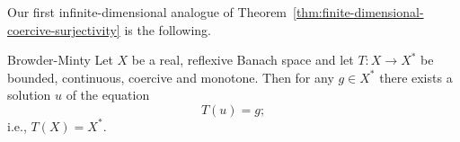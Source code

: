 Our first infinite-dimensional analogue of Theorem~\ref{thm:finite-dimensional-coercive-surjectivity} is the following.

\begin{Theorem}{Browder-Minty}
\label{thm:browder-minty-surjectivity}
Let $X$ be a real, reflexive Banach space and let $T:X\to X^*$ be bounded, continuous, coercive and monotone. Then for any $g\in X^*$ there exists a solution $u$ of the equation
\begin{equation}\label{eq:browder-minty-surjectivity-equation}
T(u)=g;
\end{equation}
i.e., $T(X)=X^*$.
\end{Theorem}

\begingroup
\renewcommand{\endProof}{\par\nobreak\hfill$\blacksquare$\par\vspace{0.1cm}}
